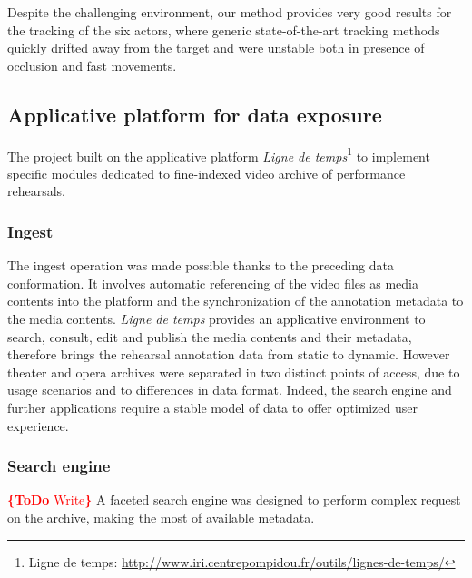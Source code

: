 \documentclass[conference]{IEEEtran}
\newcommand{\todo}[1]{\noindent\textcolor{red}{{\bf \{ToDo} #1{\bf \}}}}
\begin{document}
Despite the challenging environment, our method provides very good results for the tracking of the six actors, where generic state-of-the-art tracking methods quickly drifted away from the target  and were unstable both in presence of occlusion and fast movements. 



\subsection{Applicative platform for data exposure}
The project built on the applicative platform \emph{Ligne de temps}\footnote{Ligne de temps: \url{http://www.iri.centrepompidou.fr/outils/lignes-de-temps/}} to implement specific modules dedicated to fine-indexed video archive of performance rehearsals.

\subsubsection{Ingest}
The ingest operation was made possible thanks to the preceding data conformation. It involves automatic referencing of the video files as media contents into the platform and the synchronization of the annotation metadata to the media contents. \emph{Ligne de temps} provides an applicative environment to search, consult, edit and publish the media contents and their metadata, therefore brings the rehearsal annotation data from static to dynamic. \linebreak
However theater and opera archives were separated in two distinct points of access, due to usage scenarios and to differences in data format. Indeed, the search engine and further applications require a stable model of data to offer optimized user experience.

\subsubsection{Search engine}
\todo{Write}
A faceted search engine was designed to perform complex request on the archive, making the most of available metadata.
\end{document}
